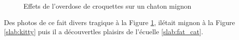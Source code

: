 \begin{figure}[h!]
\caption{Effets  de l’overdose  de  croquettes  sur un  chaton  mignon}
\label{lab:cat}
\end{figure}
Des  photos  de ce fait  divers  tragique à la  Figure \ref{lab:cat}, ilétait  mignon à la  Figure 
\ref{slab:kitty} puis il a découvertles  plaisirs  de l’écuelle \ref{slab:fat_cat}.
